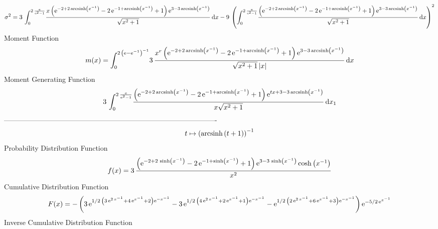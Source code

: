 \documentclass[12pt]{article}
\begin{document}
 $$ \sigma^2 = 3\,\int_{0}^{2\,{\frac {{\rm e}}{{{\rm e}^{2}}-1}}}\!{\frac {x \left( 
{{\rm e}^{-2+2\,{\rm arcsinh} \left({x}^{-1}\right)}}-2\,{{\rm e}^{-1+
{\rm arcsinh} \left({x}^{-1}\right)}}+1 \right) {{\rm e}^{3-3\,
{\rm arcsinh} \left({x}^{-1}\right)}}}{\sqrt {{x}^{2}+1}}}\,{\rm d}x-9
\, \left( \int_{0}^{2\,{\frac {{\rm e}}{{{\rm e}^{2}}-1}}}\!{\frac {
 \left( {{\rm e}^{-2+2\,{\rm arcsinh} \left({x}^{-1}\right)}}-2\,{
{\rm e}^{-1+{\rm arcsinh} \left({x}^{-1}\right)}}+1 \right) {{\rm e}^{
3-3\,{\rm arcsinh} \left({x}^{-1}\right)}}}{\sqrt {{x}^{2}+1}}}
\,{\rm d}x \right) ^{2}
$$Moment Function 
 $$ m(x) = \int_{0}^{2\, \left( {\rm e}-{{\rm e}^{-1}} \right) ^{-1}}\!3\,{\frac 
{{x}^{r} \left( {{\rm e}^{-2+2\,{\rm arcsinh} \left({x}^{-1}\right)}}-
2\,{{\rm e}^{-1+{\rm arcsinh} \left({x}^{-1}\right)}}+1 \right) {
{\rm e}^{3-3\,{\rm arcsinh} \left({x}^{-1}\right)}}}{\sqrt {{x}^{2}+1}
 \left| x \right| }}\,{\rm d}x
$$ Moment Generating Function 
 $$3\,\int_{0}^{2\,{\frac {{\rm e}}{{{\rm e}^{2}}-1}}}\!{\frac { \left( {
{\rm e}^{-2+2\,{\rm arcsinh} \left({x}^{-1}\right)}}-2\,{{\rm e}^{-1+
{\rm arcsinh} \left({x}^{-1}\right)}}+1 \right) {{\rm e}^{tx+3-3\,
{\rm arcsinh} \left({x}^{-1}\right)}}}{x\sqrt {{x}^{2}+1}}}\,{\rm d}x_
{{1}}
$$-------------------------------------------------------------------------------------------  \\$$t\mapsto  \left( {\rm arcsinh} \left(t+1\right) \right) ^{-1}
$$Probability Distribution Function 
$$  f(x)=3\,{\frac { \left( {{\rm e}^{-2+2\,\sinh \left( {x}^{-1} \right) }}-2
\,{{\rm e}^{-1+\sinh \left( {x}^{-1} \right) }}+1 \right) {{\rm e}^{3-
3\,\sinh \left( {x}^{-1} \right) }}\cosh \left( {x}^{-1} \right) }{{x}
^{2}}}
$$Cumulative Distribution Function  
 $$F(x)=- \left( 3\,{{\rm e}^{1/2\, \left( 3\,{{\rm e}^{2\,{x}^{-1}}}+4\,{
{\rm e}^{{x}^{-1}}}+2 \right) {{\rm e}^{-{x}^{-1}}}}}-3\,{{\rm e}^{1/2
\, \left( 4\,{{\rm e}^{2\,{x}^{-1}}}+2\,{{\rm e}^{{x}^{-1}}}+1
 \right) {{\rm e}^{-{x}^{-1}}}}}-{{\rm e}^{1/2\, \left( 2\,{{\rm e}^{2
\,{x}^{-1}}}+6\,{{\rm e}^{{x}^{-1}}}+3 \right) {{\rm e}^{-{x}^{-1}}}}}
 \right) {{\rm e}^{-5/2\,{{\rm e}^{{x}^{-1}}}}}
$$ Inverse Cumulative Distribution Function 
\end{document}
